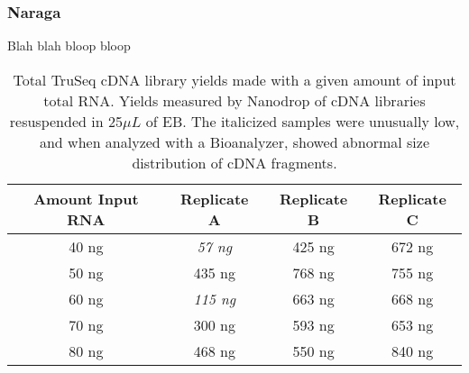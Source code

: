 \subsubsection{Naraga}
Blah blah bloop bloop


\begin{table}[htdp]
\caption{Total TruSeq cDNA library yields made with a given amount of input total RNA.  Yields measured by Nanodrop of cDNA libraries resuspended in 25$\mu L$ of EB. The italicized samples were unusually low, and when analyzed with a Bioanalyzer, showed abnormal size distribution of cDNA fragments.}
\begin{center}
\begin{tabular}{|c|c|c|c|}\hline
Amount Input RNA & Replicate A & Replicate B & Replicate C\\\hline
40 ng & {\em  57 ng}  & 425 ng & 672 ng\\
50 ng & 435 ng & 768 ng & 755 ng\\
60 ng & {\em 115 ng} & 663 ng & 668 ng\\
70 ng & 300 ng & 593 ng & 653 ng\\
80 ng & 468 ng & 550 ng & 840 ng\\\hline
\end{tabular}
\end{center}
\label{table:removeme}
\end{table}


